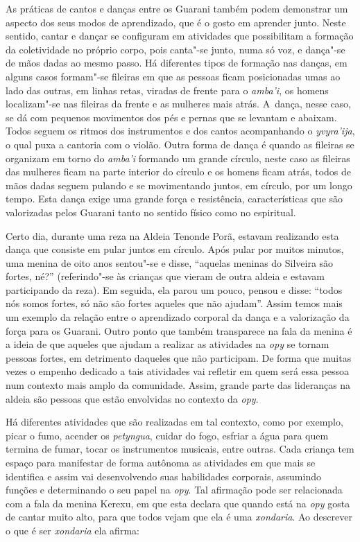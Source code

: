 As práticas de cantos e danças entre os Guarani também podem demonstrar
um aspecto dos seus modos de aprendizado, que é o gosto em aprender
junto. Neste sentido, cantar e dançar se configuram em atividades que
possibilitam a formação da coletividade no próprio corpo, pois canta"-se
junto, numa só voz, e dança"-se de mãos dadas ao mesmo passo. Há
diferentes tipos de formação nas danças, em alguns casos formam"-se
fileiras em que as pessoas ficam posicionadas umas ao lado das outras,
em linhas retas, viradas de frente para o \emph{amba’i}, os homens
localizam"-se nas fileiras da frente e as mulheres mais atrás. A~dança,
nesse caso, se dá com pequenos movimentos dos pés e pernas que se
levantam e abaixam. Todos seguem os ritmos dos instrumentos e dos
cantos acompanhando o \emph{yvyra’ija}, o qual puxa a cantoria com o violão.
Outra forma de dança é quando as fileiras se organizam em torno do
\emph{amba’i} formando um grande círculo, neste caso as fileiras das mulheres
ficam na parte interior do círculo e os homens ficam atrás, todos de
mãos dadas seguem pulando e se movimentando juntos, em círculo, por um
longo tempo. Esta dança exige uma grande força e resistência,
características que são valorizadas pelos Guarani tanto no sentido
físico como no espiritual.

Certo dia, durante uma reza na Aldeia Tenonde Porã, estavam realizando
esta dança que consiste em pular juntos em círculo. Após pular por
muitos minutos, uma menina de oito anos sentou"-se e disse, ``aquelas
meninas do Silveira são fortes, né?'' (referindo"-se às crianças que
vieram de outra aldeia e estavam participando da reza). Em seguida, ela
parou um pouco, pensou e disse: ``todos nós somos fortes, só não são
fortes aqueles que não ajudam''. Assim temos mais um exemplo da relação
entre o aprendizado corporal da dança e a valorização da força para os
Guarani. Outro ponto que também transparece na fala da menina é a ideia
de que aqueles que ajudam a realizar as atividades na \emph{opy} se tornam
pessoas fortes, em detrimento daqueles que não participam. De forma que
muitas vezes o empenho dedicado a tais atividades vai refletir em quem
será essa pessoa num contexto mais amplo da comunidade. Assim, grande
parte das lideranças na aldeia são pessoas que estão envolvidas no
contexto da \emph{opy}.

Há diferentes atividades que são realizadas em tal contexto, como por
exemplo, picar o fumo, acender os \emph{petyngua}, cuidar do fogo, esfriar a
água para quem termina de fumar, tocar os instrumentos musicais, entre
outras. Cada criança tem espaço para manifestar de forma autônoma as
atividades em que mais se identifica e assim vai desenvolvendo suas
habilidades corporais, assumindo funções e determinando o seu papel na
\emph{opy}. Tal afirmação pode ser relacionada com a fala da menina Kerexu, em
que esta declara que quando está na \emph{opy} gosta de cantar muito alto,
para que todos vejam que ela é uma \emph{xondaria}. Ao descrever o que é ser
\emph{xondaria} ela afirma:

